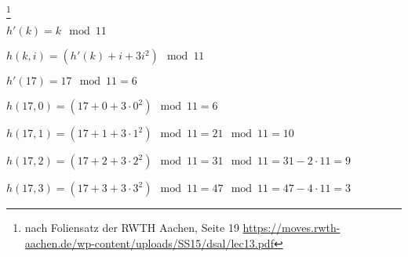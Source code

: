 \documentclass{lehramt-informatik-aufgabe}
\begin{document}

\footnote{nach Foliensatz der RWTH Aachen, Seite 19 \url{https://moves.rwth-aachen.de/wp-content/uploads/SS15/dsal/lec13.pdf}}

$h'(k) = k \mod 11$

$h(k, i) = (h'(k) + i + 3i^2) \mod 11$

$h'(17) = 17 \mod 11 = 6$


$h(17, 0) = (17 + 0 + 3 \cdot 0^2) \mod 11 = 6$

$h(17, 1) = (17 + 1 + 3 \cdot 1^2) \mod 11 = 21 \mod 11 = 10$

$h(17, 2) = (17 + 2 + 3 \cdot 2^2) \mod 11 = 31 \mod 11 = 31 - 2 \cdot 11 = 9$

$h(17, 3) = (17 + 3 + 3 \cdot 3^2) \mod 11 = 47 \mod 11 = 47 - 4 \cdot 11 = 3$
\end{document}

